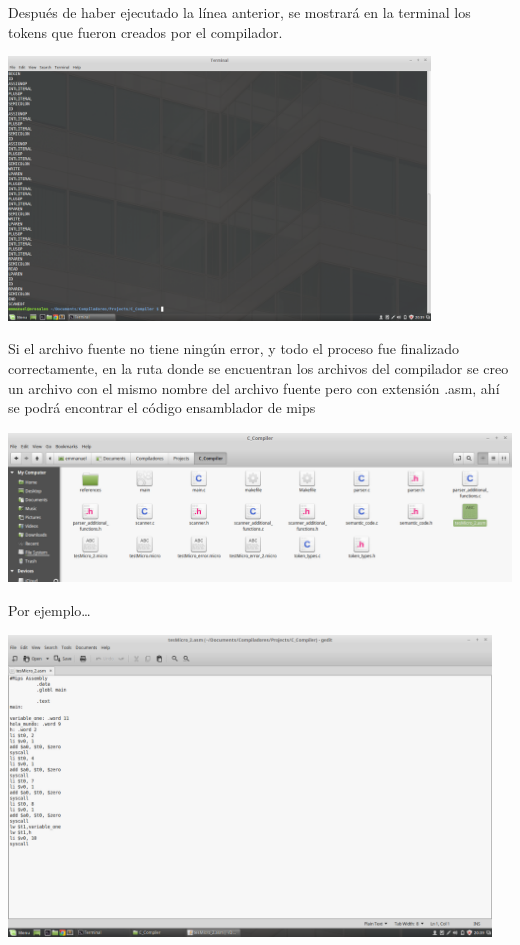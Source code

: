 \documentclass[12pt]{article}
\begin{document}
    Después de haber ejecutado la línea anterior, se mostrará en la terminal los tokens que fueron creados por el compilador.
    \begin{center}
    \includegraphics[height= 7cm]{main3}
    \end{center}

    Si el archivo fuente no tiene ningún error, y todo el proceso fue finalizado correctamente, en la ruta donde se encuentran los archivos del compilador se creo un archivo con el mismo nombre del archivo fuente pero con extensión .asm, ahí se podrá encontrar el código ensamblador de mips 
    \begin{center}
    \includegraphics[height= 4cm]{main4}
    \end{center}
   
    Por ejemplo…
    
    \begin{center}
    \includegraphics[height= 8cm]{main5}
    \end{center}
    
\end{document}
